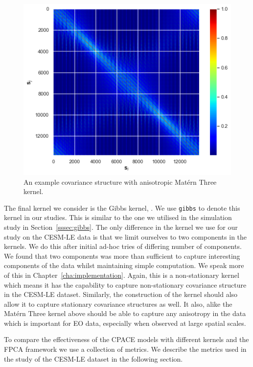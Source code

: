 \begin{figure}[h]
	\centering
	\includegraphics[width=\textwidth]{matern_aniso_ex}
	\caption{An example covariance structure with anisotropic Mat\'ern Three kernel.}
	\label{fig:matern_aniso}
\end{figure}

The final kernel we consider is the Gibbs kernel, \citep{gibbs_bayesian_1998}.
We use \verb*|gibbs| to denote this kernel in our studies.
This is similar to the one we utilised in the simulation study in Section~\ref{sssec:gibbs}. 
The only difference in the kernel we use for our study on the CESM-LE data is that we limit ourselves to two components in the kernels.
We do this after initial ad-hoc tries of differing number of components. 
We found that two components was more than sufficient to capture interesting components of the data whilst maintaining simple computation.
We speak more of this in Chapter~\ref{cha:implementation}.
Again, this is a non-stationary kernel which means it has the capability to capture non-stationary covariance structure in the CESM-LE dataset. 
Similarly, the construction of the kernel should also allow it to capture stationary covariance structures as well.
It also, alike the Mat\'ern Three kernel above should be able to capture any anisotropy in the data which is important for EO data, especially when observed at large spatial scales.

To compare the effectiveness of the CPACE models with different kernels and the FPCA framework we use a collection of metrics. 
We describe the metrics used in the study of the CESM-LE dataset in the following section. 

